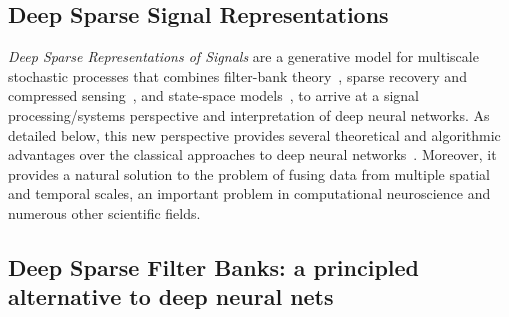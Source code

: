 \documentclass[12pt]{article}
\begin{document}
\subsection*{Deep Sparse Signal Representations}

\emph{Deep Sparse Representations of Signals} are a generative model for multiscale stochastic processes that combines filter-bank theory~\cite{fliege1994multirate,strang1996wavelets,daubechies1992ten}, sparse recovery and compressed sensing~\cite{donoho2006compressed,candes2008introduction}, and state-space models~\cite{Ba:12,ba2013b}, to arrive at a signal processing/systems perspective and interpretation of deep neural networks. As detailed below, this new perspective provides several theoretical and algorithmic advantages over the classical approaches to deep neural networks~\cite{lecun2015deep}. Moreover, it provides a natural solution to the problem of fusing data from multiple spatial and temporal scales, an important problem in computational neuroscience and numerous other scientific fields.

\subsection*{Deep Sparse Filter Banks: a principled alternative to deep neural nets}
\end{document}
